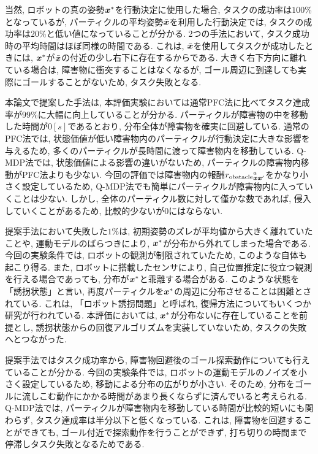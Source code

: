 当然, ロボットの真の姿勢$\boldsymbol{x}^{*}$を行動決定に使用した場合, タスクの成功率は$100\%$となっているが, 
パーティクルの平均姿勢$\bar{\boldsymbol{x}}$を利用した行動決定では, タスクの成功率は$20\%$と低い値になっていることが分かる. 
2つの手法において, タスク成功時の平均時間はほぼ同様の時間である. 
これは, $\bar{\boldsymbol{x}}$を使用してタスクが成功したときには, $\boldsymbol{x}^{*}$が$\bar{\boldsymbol{x}}$の付近の少し右下に存在するからである. 
大きく右下方向に離れている場合は, 障害物に衝突することはなくなるが, ゴール周辺に到達しても実際にゴールすることがないため, タスク失敗となる. 

本論文で提案した手法は, 本評価実験においては通常PFC法に比べてタスク達成率が$99\%$に大幅に向上していることが分かる. 
パーティクルが障害物の中を移動した時間が$0[\si{s}]$であるとおり, 分布全体が障害物を確実に回避している. 
通常のPFC法では, 状態価値が低い障害物内のパーティクルが行動決定に大きな影響を与えるため, 
多くのパーティクルが長時間に渡って障害物内を移動している. 
Q-MDP法では, 状態価値による影響の違いがないため, パーティクルの障害物内移動がPFC法よりも少ない. 
今回の評価では障害物内の報酬${r_{\rm obstacle}}^{a}_{\bm{x}\bm{x}^{\prime}}$をかなり小さく設定しているため, 
Q-MDP法でも簡単にパーティクルが障害物内に入っていくことは少ない. 
しかし, 全体のパーティクル数に対して僅かな数であれば, 侵入していくことがあるため, 比較的少ないが$0$にはならない. 

提案手法において失敗した$1\%$は, 初期姿勢のズレが平均値から大きく離れていたことや, 運動モデルのばらつきにより, 
$\boldsymbol{x}^{*}$が分布から外れてしまった場合である. 
今回の実験条件では, ロボットの観測が制限されていたため, このような自体も起こり得る. 
また, ロボットに搭載したセンサにより, 自己位置推定に役立つ観測を行える場合であっても, 分布が$\boldsymbol{x}^{*}$と乖離する場合がある. 
このような状態を「誘拐状態」と言い, 再度パーティクルを$\boldsymbol{x}^{*}$の周辺に分布させることは困難とされている. 
これは, 「ロボット誘拐問題」と呼ばれ, 復帰方法についてもいくつか研究が行われている\cite{lenser2000etal, aa}. 
本評価においては, $\boldsymbol{x}^{*}$が分布ないに存在していることを前提とし, 誘拐状態からの回復アルゴリズムを実装していないため, 
タスクの失敗へとつながった. 

提案手法ではタスク成功率から, 障害物回避後のゴール探索動作についても行えていることが分かる. 
今回の実験条件では, ロボットの運動モデルのノイズを小さく設定しているため, 移動による分布の広がりが小さい. 
そのため, 分布をゴールに流しこむ動作にかかる時間があまり長くならずに済んでいると考えられる. 
Q-MDP法では, パーティクルが障害物内を移動している時間が比較的短いにも関わらず, タスク達成率は半分以下と低くなっている. 
これは, 障害物を回避することができても, ゴール付近で探索動作を行うことができず, 打ち切りの時間まで停滞しタスク失敗となるためである. 

